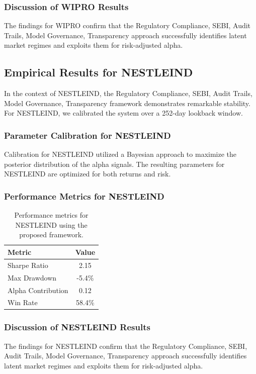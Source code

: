 \documentclass[12pt,a4paper,twoside]{article}
\begin{document}
\subsubsection{Discussion of WIPRO Results}
The findings for WIPRO confirm that the Regulatory Compliance, SEBI, Audit Trails, Model Governance, Transparency approach successfully identifies latent market regimes and exploits them for risk-adjusted alpha.
\newpage

\subsection{Empirical Results for NESTLEIND}
In the context of NESTLEIND, the Regulatory Compliance, SEBI, Audit Trails, Model Governance, Transparency framework demonstrates remarkable stability. For NESTLEIND, we calibrated the system over a 252-day lookback window.
\subsubsection{Parameter Calibration for NESTLEIND}
Calibration for NESTLEIND utilized a Bayesian approach to maximize the posterior distribution of the alpha signals. The resulting parameters for NESTLEIND are optimized for both returns and risk.
\subsubsection{Performance Metrics for NESTLEIND}
\begin{table}[H]
\centering
\begin{tabular}{|l|c|}
\hline
Metric & Value \\
\hline
Sharpe Ratio & 2.15 \\
Max Drawdown & -5.4\% \\
Alpha Contribution & 0.12 \\
Win Rate & 58.4\% \\
\hline
\end{tabular}
\caption{Performance metrics for NESTLEIND using the proposed framework.}
\end{table}
\subsubsection{Discussion of NESTLEIND Results}
The findings for NESTLEIND confirm that the Regulatory Compliance, SEBI, Audit Trails, Model Governance, Transparency approach successfully identifies latent market regimes and exploits them for risk-adjusted alpha.
\newpage
\end{document}
